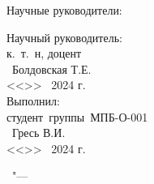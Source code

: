 %
\vspace{0pt plus4fill} %
\begin{flushright}
    \ifdefined\supervisorTwoFio
    Научные руководители:

    \supervisorRegalia

    \ifdefined\supervisorDead
    \framebox{\supervisorFio}
    \else
    \supervisorFio
    \fi

    \supervisorTwoRegalia

    \ifdefined\supervisorTwoDead
    \framebox{\supervisorTwoFio}
    \else
    \supervisorTwoFio
    \fi
    \else
    Научный руководитель:\\
    к.~т.~н, доцент\\
    \underline{\hspace{1.5in}}~Болдовская Т.Е.\\
    <<\underline{\hspace{0.3in}}>> \underline{\hspace{1in}}~2024 г.\\
    Выполнил:\\
    студент~группы~МПБ-О-001\\
    \underline{\hspace{1.5in}}~Гресь В.И.\\
    <<\underline{\hspace{0.3in}}>> \underline{\hspace{1in}}~2024 г.

    \ifdefined\supervisorDead
    \else
    \fi
    \fi

\end{flushright}
%
\vspace{0pt plus4fill} %
{\centering\thesisCity\ "--- \thesisYear\par}
